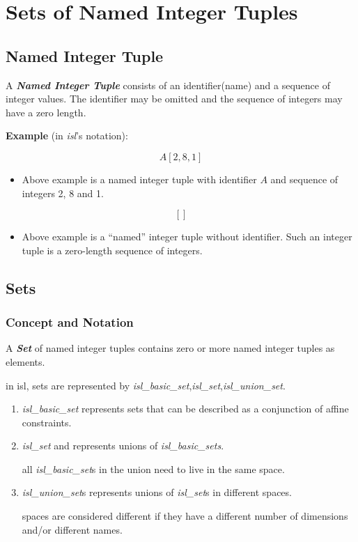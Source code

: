 \section{Sets of Named Integer Tuples}\label{section:Sets of Named Integer Tuples}

\subsection{Named Integer Tuple}

\textcolor{vr}{A \textbf{\emph{Named Integer Tuple}} consists of an identifier(name) and a sequence of integer values}. The identifier may be omitted and the sequence of integers may have a zero length.

\textbf{Example} (in \emph{isl}'s notation):

$$A[2,8,1]$$

\begin{itemize}
  \item Above example is a named integer tuple with identifier $A$ and sequence of integers 2, 8 and 1.
\end{itemize}

$$[]$$

\begin{itemize}
  \item Above example is a “named” integer tuple without identifier. Such an integer tuple is a zero-length sequence of integers.
\end{itemize}

\subsection{Sets}

\subsubsection{Concept and Notation}

\textcolor{vr}{A \textbf{\emph{Set}} of named integer tuples contains zero or more named integer tuples as elements}.

in isl, sets are represented by \textcolor{pg}{\emph{isl\_basic\_set}},\textcolor{pg}{\emph{isl\_set}},\textcolor{pg}{\emph{isl\_union\_set}}.

\begin{enumerate}
  \item \textcolor{pg}{\emph{isl\_basic\_set}} represents sets that can be described as a conjunction of affine constraints.
  \item \textcolor{pg}{\emph{isl\_set}} and represents unions of \textcolor{pg}{\emph{isl\_basic\_sets}}.

    all \textcolor{pg}{\emph{isl\_basic\_set}}s in the union need to live in the same space.

  \item \textcolor{pg}{\emph{isl\_union\_set}}s represents unions of \textcolor{pg}{\emph{isl\_set}}s in different spaces.

    spaces are considered different if they have a different number of dimensions and/or different names.
\end{enumerate}



